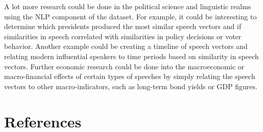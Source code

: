 \documentclass[11pt,preprint, authoryear]{elsarticle}
\numberwithin{equation}{section}
\numberwithin{figure}{section}
\numberwithin{table}{section}
\begin{document}
A lot more research could be done in the political science and
linguistic realms using the NLP component of the dataset. For example,
it could be interesting to determine which presidents produced the most
similar speech vectors and if similarities in speech correlated with
similarities in policy decisions or voter behavior. Another example
could be creating a timeline of speech vectors and relating modern
influential speakers to time periods based on similarity in speech
vectors. Further economic research could be done into the macroeconomic
or macro-financial effects of certain types of speeches by simply
relating the speech vectors to other macro-indicators, such as long-term
bond yields or GDP figures.

\newpage

\hypertarget{references}{%
\section*{References}\label{references}}
\end{document}
